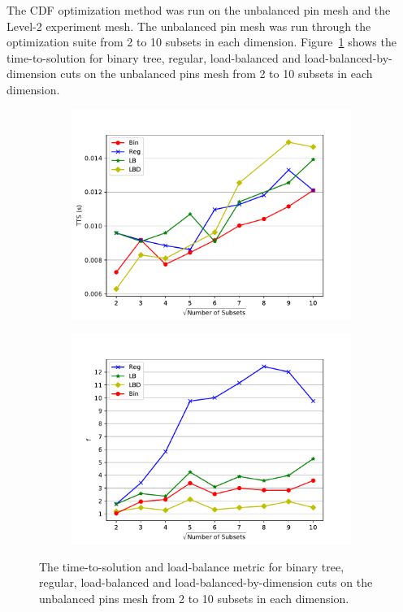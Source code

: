 The CDF optimization method was run on the unbalanced pin mesh and the Level-2 experiment mesh.
The unbalanced pin mesh was run through the optimization suite from 2 to 10 subsets in each dimension.
Figure~\ref{ubp_opt} shows the time-to-solution for binary tree, regular, load-balanced and load-balanced-by-dimension cuts on the unbalanced pins mesh from 2 to 10 subsets in each dimension.
\begin{figure}[h]
\centering
  \begin{subfigure}[t]{0.49\textwidth}
    \centering
  \includegraphics[scale=0.55]{../../figures/unbalanced_pins_best_comparison.pdf}
  \end{subfigure}
    \begin{subfigure}[t]{0.49\textwidth}
    \centering
    \includegraphics[scale=0.55]{../../figures/spiderweb_metric_study.pdf}
  \end{subfigure}  
  \caption{The time-to-solution and load-balance metric for binary tree, regular, load-balanced and load-balanced-by-dimension cuts on the unbalanced pins mesh from 2 to 10 subsets in each dimension.}
  \label{ubp_opt}
\end{figure}
